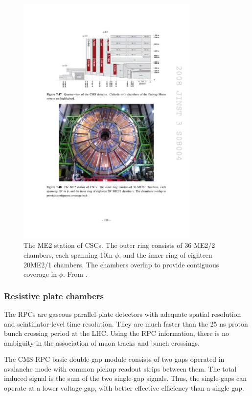 \begin{figure}[hbtp]
\centering
\includegraphics[width=0.8\textwidth]{figures/cms_cscs_me2.pdf}
\caption{
The ME2 station of CSCs. The outer ring consists of 36 ME2/2 chambers, each
spanning 10\degree in $\phi$, and the inner ring of eighteen 20\degree ME2/1 chambers.
The chambers overlap to provide contiguous coverage in $\phi$.
From \cite{Chatrchyan:2008aa}.
}
\label{fig:cms_cscs_me2}
\end{figure}

\subsubsection{Resistive plate chambers}

The RPCs are gaseous parallel-plate detectors with adequate spatial resolution and scintillator-level time resolution.
They are much faster than the 25 ns proton bunch crossing period at the LHC.
Using the RPC information, there is no ambiguity in the association of muon tracks and bunch crossings.

The CMS RPC basic double-gap module consists of two gaps operated in avalanche mode with common
pickup readout strips between them.
The total induced signal is the sum of the two single-gap signals.
Thus, the single-gaps can operate at a lower voltage gap,
with better effective efficiency than a single gap.

